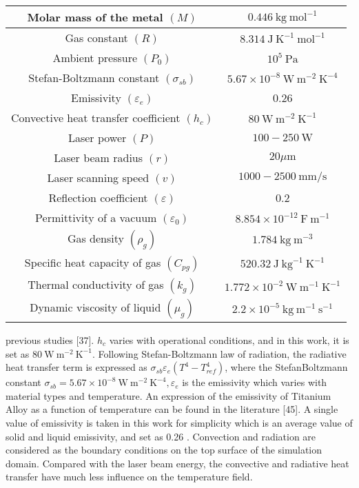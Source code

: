 \documentclass[10pt]{article}
\begin{document}
\begin{center}
\begin{tabular}{|c|c|}
\hline
Molar mass of the metal $(M)$ & $0.446 \mathrm{~kg} \mathrm{~mol}^{-1}$ \\
\hline
Gas constant $(R)$ & $8.314 \mathrm{~J} \mathrm{~K}^{-1} \mathrm{~mol}^{-1}$ \\
\hline
Ambient pressure $\left(P_{0}\right)$ & $10^{5} \mathrm{~Pa}$ \\
\hline
Stefan-Boltzmann constant $\left(\sigma_{s b}\right)$ & $5.67 \times 10^{-8} \mathrm{~W} \mathrm{~m}^{-2} \mathrm{~K}^{-4}$ \\
\hline
Emissivity $\left(\varepsilon_{e}\right)$ & 0.26 \\
\hline
Convective heat transfer coefficient $\left(h_{c}\right)$ & $80 \mathrm{~W} \mathrm{~m}^{-2} \mathrm{~K}^{-1}$ \\
\hline
Laser power $(P)$ & $100-250 \mathrm{~W}$ \\
\hline
Laser beam radius $(r)$ & $20 \mu \mathrm{m}$ \\
\hline
Laser scanning speed $(v)$ & $1000-2500 \mathrm{~mm} / \mathrm{s}$ \\
\hline
Reflection coefficient $(\varepsilon)$ & 0.2 \\
\hline
Permittivity of a vacuum $\left(\varepsilon_{0}\right)$ & $8.854 \times 10^{-12} \mathrm{~F} \mathrm{~m}^{-1}$ \\
\hline
Gas density $\left(\rho_{g}\right)$ & $1.784 \mathrm{~kg} \mathrm{~m}^{-3}$ \\
\hline
Specific heat capacity of gas $\left(C_{p g}\right)$ & $520.32 \mathrm{~J} \mathrm{~kg}^{-1} \mathrm{~K}^{-1}$ \\
\hline
Thermal conductivity of gas $\left(k_{g}\right)$ & $1.772 \times 10^{-2} \mathrm{~W} \mathrm{~m}^{-1} \mathrm{~K}^{-1}$ \\
\hline
Dynamic viscosity of liquid $\left(\mu_{g}\right)$ & $2.2 \times 10^{-5} \mathrm{~kg} \mathrm{~m}^{-1} \mathrm{~s}^{-1}$ \\
\hline
\end{tabular}
\end{center}

previous studies [37]. $h_{c}$ varies with operational conditions, and in this work, it is set as $80 \mathrm{~W} \mathrm{~m}^{-2} \mathrm{~K}^{-1}$. Following Stefan-Boltzmann law of radiation, the radiative heat transfer term is expressed as $\sigma_{s b} \varepsilon_{e}\left(T^{4}-T_{r e f}^{4}\right)$, where the StefanBoltzmann constant $\sigma_{s b}=5.67 \times 10^{-8} \mathrm{~W} \mathrm{~m}^{-2} \mathrm{~K}^{-4}, \varepsilon_{e}$ is the emissivity which varies with material types and temperature. An expression of the emissivity of Titanium Alloy as a function of temperature can be found in the literature [45]. A single value of emissivity is taken in this work for simplicity which is an average value of solid and liquid emissivity, and set as 0.26 . Convection and radiation are considered as the boundary conditions on the top surface of the simulation domain. Compared with the laser beam energy, the convective and radiative heat transfer have much less influence on the temperature field.
\end{document}
